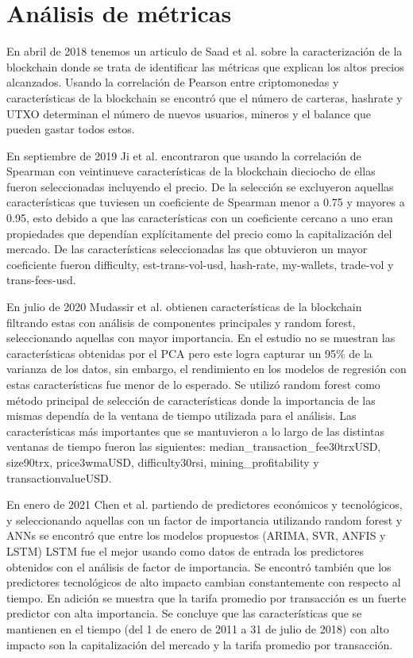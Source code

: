 \section{Análisis de métricas} 

En abril de 2018 tenemos un articulo de Saad et al. \cite{saadCharacterizingBlockchainbasedCryptocurrencies2018} sobre la caracterización de la blockchain donde se trata de identificar las métricas que explican los altos precios alcanzados. Usando la correlación de Pearson entre criptomonedas y características de la blockchain se encontró que el número de carteras, hashrate y UTXO determinan el número de nuevos usuarios, mineros y el balance que pueden gastar todos estos. 

En septiembre de 2019 Ji et al.  \cite{jiComparativeStudyBitcoin2019} encontraron que usando la correlación de Spearman con veintinueve características de la blockchain dieciocho de ellas fueron seleccionadas incluyendo el precio. De la selección se excluyeron aquellas características que tuviesen un coeficiente de Spearman menor a 0.75 y mayores a 0.95, esto debido a que las características con un coeficiente cercano a uno eran propiedades que dependían explícitamente del precio como la capitalización del mercado. De las características seleccionadas las que obtuvieron un mayor coeficiente fueron difficulty, est-trans-vol-usd, hash-rate, my-wallets, trade-vol y trans-fees-usd.

En julio de 2020 Mudassir et al. \cite{mudassirTimeseriesForecastingBitcoin2020} obtienen características de la blockchain filtrando estas con análisis de componentes principales y random forest, seleccionando aquellas con mayor importancia. En el estudio no se muestran las características obtenidas por el PCA pero este logra capturar un 95\% de la varianza de los datos, sin embargo, el rendimiento en los modelos de regresión con estas características fue menor de lo esperado.
Se utilizó random forest como método principal de selección de características donde la importancia de las mismas dependía de la ventana de tiempo utilizada para el análisis. Las características más importantes que se mantuvieron a lo largo de las distintas ventanas de tiempo fueron las siguientes: median\_transaction\_fee30trxUSD, size90trx, price3wmaUSD, difficulty30rsi, mining\_profitability y transactionvalueUSD. 

En enero de 2021 Chen et al. \cite{chenMachineLearningModel2021} partiendo de predictores económicos y tecnológicos, y seleccionando aquellas con un factor de importancia utilizando random forest y ANNs se encontró que entre los modelos propuestos (ARIMA, SVR, ANFIS y LSTM) LSTM fue el mejor usando como datos de entrada los predictores obtenidos con el análisis de factor de importancia. Se encontró también que los predictores tecnológicos de alto impacto cambian constantemente con respecto al tiempo. En adición se muestra que la tarifa promedio por transacción es un fuerte predictor con alta importancia. Se concluye que las características que se mantienen en el tiempo (del 1 de enero de 2011 a 31 de julio de 2018) con alto impacto son la capitalización del mercado y la tarifa promedio por transacción.

